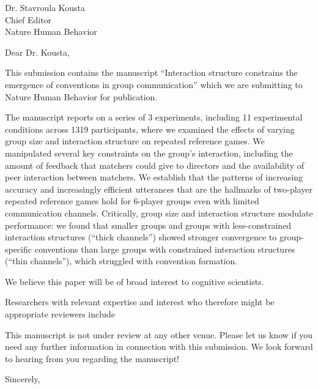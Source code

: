 \documentclass{stanfordletter}
\begin{document}
	\signature{Veronica Boyce \\ Robert Hawkins \\ Noah D. Goodman \\ Michael C. Frank}
	
	
	\begin{letter}{Dr. Stavroula Kousta \\ Chief Editor \\ Nature Human Behavior}
		
		
          \opening{Dear Dr. Kousta,} 
          This
          submission contains the manuscript ``Interaction structure constrains the emergence of conventions in group communication''
          which we are submitting to Nature Human Behavior for
          publication. 
          
          The manuscript reports on a series of 3 experiments, including 11 experimental conditions across 1319 participants, where we examined the effects of varying group size and interaction structure on repeated reference games. We manipulated several key constraints on the group’s interaction, including the amount of feedback that matchers could give to directors
          and the availability of peer interaction between matchers. We establish that the patterns of increasing accuracy and increasingly efficient utterances that are the hallmarks of two-player repeated reference games hold for 6-player groups even with limited communication channels. Critically, group size and interaction structure modulate performance:  we found that smaller groups and groups with less-constrained interaction structures (“thick channels”) showed stronger convergence to group-specific conventions than large groups with constrained interaction structures (“thin
          channels”), which struggled with convention formation.
          
          We believe this paper will be of broad
          interest to cognitive scientists.
		 
          Researchers with relevant expertise and interest who
          therefore might be appropriate reviewers include %
		 
          This manuscript is not under review at any other
          venue. Please let us know if you need any further
          information in connection with this submission. We look
          forward to hearing from you regarding the manuscript!
          \closing{Sincerely,}
		
	\end{letter}
	
\end{document}
